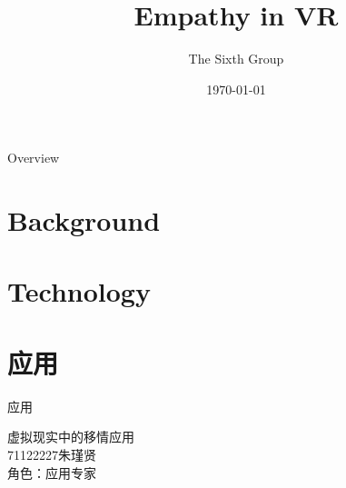 \documentclass[aspectratio=169,xcolor=dvipsnames]{beamer}
\title{Empathy in VR}
\author{The Sixth Group}
\date{\today} %
\begin{document}
\begin{frame}
    \titlepage
\end{frame}

\begin{frame}{Overview}
    \tableofcontents
\end{frame}

\section{Background}

\section{Technology}

\section{应用}
\begin{frame}{应用}
    \begin{center}
        \Large{虚拟现实中的移情应用}\\
        \vspace{0.5cm}
        \normalsize{71122227朱瑾贤}
        \\
        \vspace{0.5cm}
        \normalsize{角色：应用专家}
    \end{center}
\end{frame}
\end{document}

